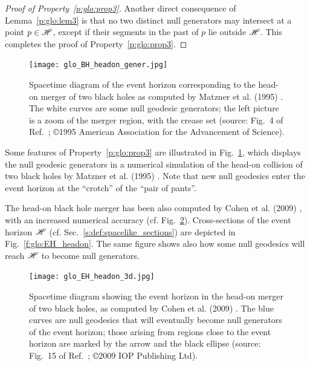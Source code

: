 \begin{proof}[Proof of Property~\ref{p:glo:prop3}]
Another direct consequence of Lemma~\ref{p:glo:lem3} is that no two distinct null generators
may intersect at a point $p\in\mathscr{H}$, except if their segments in the past of
$p$ lie outside $\mathscr{H}$.
This completes the proof of Property~\ref{p:glo:prop3}.
\end{proof}


\begin{figure}
\centerline{\texttt{[image: glo\_BH\_headon\_gener.jpg]}}
\caption[]{\label{f:glo:BH_headon_gener} \footnotesize
Spacetime diagram of the event horizon corresponding to the head-on merger of
two black holes as computed by Matzner et al. (1995) \cite{Matzn_al95}. The
white curves are some null geodesic generators; the left picture is a zoom of
the merger region, with the crease set
(source: Fig.~4 of Ref.~\cite{Matzn_al95}; \copyright 1995 American Association for the Advancement of Science).}
\end{figure}



Some features of Property~\ref{p:glo:prop3} are illustrated in Fig.~\ref{f:glo:BH_headon_gener},
which displays the null geodesic generators in a numerical simulation
of the head-on collision of two black holes by Matzner et al. (1995) \cite{Matzn_al95}.
Note that new null geodesics enter the event horizon at the ``crotch'' of the
``pair of pants''.

The head-on black hole merger has been also computed by Cohen et al. (2009) \cite{CohenPS09}, with an increased numerical accuracy (cf. Fig.~\ref{f:glo:EH_headon_3d}).
Cross-sections of the event horizon $\mathscr{H}$ (cf. Sec.~\ref{s:def:spacelike_sections})
are depicted in Fig.~\ref{f:glo:EH_headon}. The same figure shows also how
some null geodesics will reach $\mathscr{H}$ to become null generators.


\begin{figure}
\centerline{\texttt{[image: glo\_EH\_headon\_3d.jpg]}}
\caption[]{\label{f:glo:EH_headon_3d} \footnotesize
Spacetime diagram showing the event horizon in the head-on merger of
two black holes, as computed by Cohen et al. (2009) \cite{CohenPS09}.
The blue curves are null geodesics that will eventually become null generators
of the event horizon; those arising from regions close to the event horizon
are marked by the arrow and the black ellipse
(source: Fig.~15 of Ref.~\cite{CohenPS09}; \copyright 2009 IOP Publishing Ltd).}
\end{figure}


